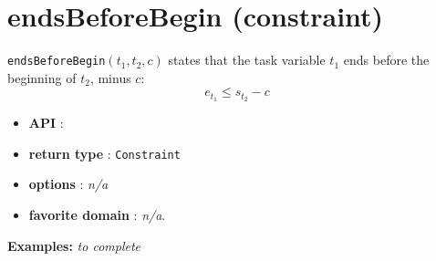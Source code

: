 \section{endsBeforeBegin (constraint)}\label{endsbeforebegin:endsbeforebeginconstraint}\hypertarget{endsbeforebegin:endsbeforebeginconstraint}{}
\begin{notedef}
\texttt{endsBeforeBegin}$(t_1,t_2,c)$ states that the task variable $t_1$ ends before the beginning of $t_2$, minus $c$:
  $$e_{t_{1}} \le s_{t_{2}} - c$$
\end{notedef}

\begin{itemize}
	\item \textbf{API} :
	\item \textbf{return type} : \texttt{Constraint}
	\item \textbf{options} : \emph{n/a}
	\item \textbf{favorite domain} : \emph{n/a}.
\end{itemize}

\textbf{Examples:}
%
\emph{to complete}
